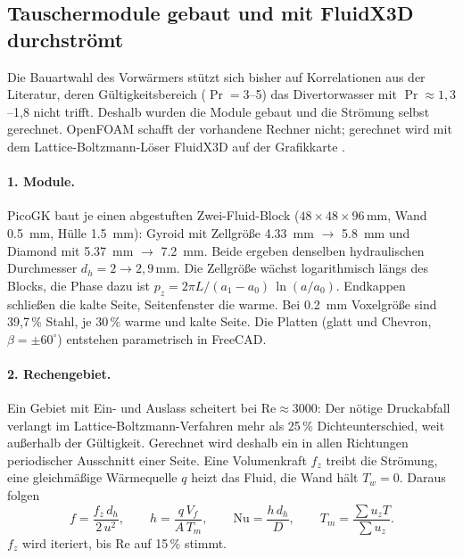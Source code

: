 \subsection{Tauschermodule gebaut und mit FluidX3D durchströmt}\label{sec:tauschercfd}
Die Bauartwahl des Vorwärmers stützt sich bisher auf Korrelationen aus der Literatur, deren Gültigkeitsbereich
($\Pr = 3$--5) das Divertorwasser mit $\Pr \approx 1{,}3$--1,8 nicht trifft. Deshalb wurden die Module gebaut und
die Strömung selbst gerechnet. OpenFOAM schafft der vorhandene Rechner nicht; gerechnet wird mit dem
Lattice-Boltzmann-Löser FluidX3D auf der Grafikkarte \cite{fluidx3d,lehmann2022fp}.

\paragraph{1. Module.} PicoGK baut je einen abgestuften Zwei-Fluid-Block ($48\times48\times96$\,mm, Wand \SI{0,5}{mm},
Hülle \SI{1,5}{mm}): Gyroid mit Zellgröße \SI{4,33}{mm} $\to$ \SI{5,8}{mm} und Diamond mit \SI{5,37}{mm} $\to$
\SI{7,2}{mm}. Beide ergeben denselben hydraulischen Durchmesser $d_h = 2 \to 2{,}9$\,mm. Die Zellgröße wächst
logarithmisch längs des Blocks, die Phase dazu ist $p_z = 2\pi L/(a_1 - a_0)\,\ln(a/a_0)$. Endkappen schließen die
kalte Seite, Seitenfenster die warme. Bei \SI{0,2}{mm} Voxelgröße sind 39,7\,\% Stahl, je 30\,\% warme und kalte
Seite. Die Platten (glatt und Chevron, $\beta = \pm 60^\circ$) entstehen parametrisch in FreeCAD.



\paragraph{2. Rechengebiet.} Ein Gebiet mit Ein- und Auslass scheitert bei $\mathrm{Re}\approx3000$: Der nötige
Druckabfall verlangt im Lattice-Boltzmann-Verfahren mehr als 25\,\% Dichteunterschied, weit außerhalb der
Gültigkeit. Gerechnet wird deshalb ein in allen Richtungen periodischer Ausschnitt einer Seite. Eine Volumenkraft
$f_z$ treibt die Strömung, eine gleichmäßige Wärmequelle $q$ heizt das Fluid, die Wand hält $T_w=0$. Daraus folgen
\[
f = \frac{f_z\,d_h}{2\,u^2},\qquad h = \frac{q\,V_f}{A\,T_m},\qquad \mathrm{Nu} = \frac{h\,d_h}{D},\qquad
T_m = \frac{\sum u_z T}{\sum u_z}.
\]
$f_z$ wird iteriert, bis Re auf 15\,\% stimmt.

